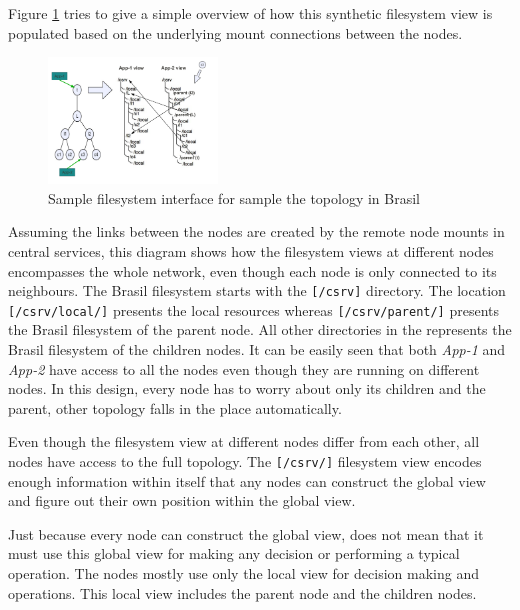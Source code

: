 Figure \ref{fig:xcpu3FSTopo} tries to give a simple overview of how this 
synthetic filesystem view is populated based on the underlying mount
connections between the nodes.

\begin{figure}[h]
  \begin{center}
    \leavevmode
      \includegraphics[height=0.3\textheight,width=0.4\textwidth]
		{./img/xcpu3FSTopo}
    \caption{Sample filesystem interface for sample the topology in Brasil}
    \label{fig:xcpu3FSTopo}
  \end{center}
\end{figure}

Assuming the links between the nodes are created by the remote node mounts in
central services, this diagram shows how the filesystem views at different
nodes encompasses the whole network, even though each node is only connected to
its neighbours. The Brasil filesystem starts with the \texttt{[/csrv]}
directory. The location \texttt{[/csrv/local/]} presents the local resources
whereas \texttt{[/csrv/parent/]} presents the Brasil filesystem of the parent
node. All other directories in the represents the Brasil filesystem of the
children nodes.  It can be easily seen that both \textit{App-1} and
\textit{App-2} have access to all the nodes even though they are running on
different nodes.  In this design, every node has to worry about only its
children and the parent, other topology falls in the place automatically.

Even though the filesystem view at different nodes differ from each other, 
all nodes have access to the full topology.  The \texttt{[/csrv/]} filesystem
view encodes enough information within itself that any nodes can construct the
global view and figure out their own position within the global view.

Just because every node can construct the global view, does not mean that it
must use this global view for making any decision or performing a typical
operation. The nodes mostly use only the local view for decision making and
operations. This local view includes the parent node and the children nodes.


